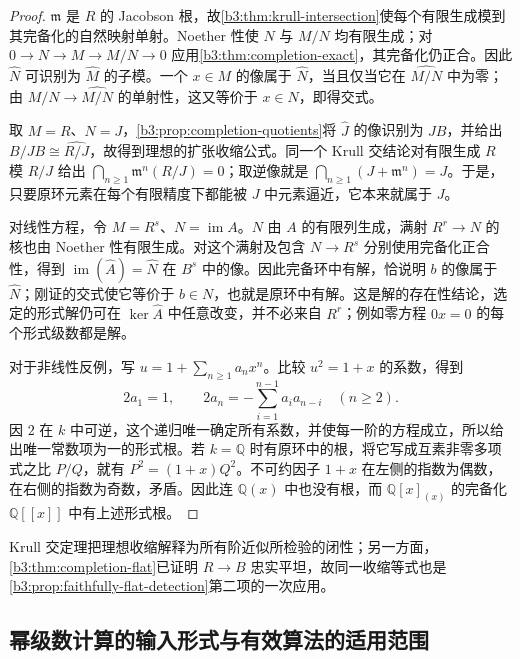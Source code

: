 \begin{proof}
	\(\mathfrak m\) 是 \(R\) 的 Jacobson 根，故\cref{b3:thm:krull-intersection}使每个有限生成模到其完备化的自然映射单射。Noether 性使 \(N\) 与 \(M/N\) 均有限生成；对 \(0\rightarrow N\rightarrow M\rightarrow M/N\rightarrow0\) 应用\cref{b3:thm:completion-exact}，其完备化仍正合。因此 \(\widehat N\) 可识别为 \(\widehat M\) 的子模。一个 \(x\in M\) 的像属于 \(\widehat N\)，当且仅当它在 \(\widehat{M/N}\) 中为零；由 \(M/N\to\widehat{M/N}\) 的单射性，这又等价于 \(x\in N\)，即得交式。

	取 \(M=R\)、\(N=J\)，\cref{b3:prop:completion-quotients}将 \(\widehat J\) 的像识别为 \(JB\)，并给出 \(B/JB\cong\widehat{R/J}\)，故得到理想的扩张收缩公式。同一个 Krull 交结论对有限生成 \(R\) 模 \(R/J\) 给出 \(\bigcap_{n\ge1}\mathfrak m^n(R/J)=0\)；取逆像就是 \(\bigcap_{n\ge1}(J+\mathfrak m^n)=J\)。于是，只要原环元素在每个有限精度下都能被 \(J\) 中元素逼近，它本来就属于 \(J\)。

	对线性方程，令 \(M=R^s\)、\(N=\operatorname{im}A\)。\(N\) 由 \(A\) 的有限列生成，满射 \(R^r\to N\) 的核也由 Noether 性有限生成。对这个满射及包含 \(N\to R^s\) 分别使用完备化正合性，得到 \(\operatorname{im}(\widehat A)=\widehat N\) 在 \(B^s\) 中的像。因此完备环中有解，恰说明 \(b\) 的像属于 \(\widehat N\)；刚证的交式使它等价于 \(b\in N\)，也就是原环中有解。这是解的存在性结论，选定的形式解仍可在 \(\ker\widehat A\) 中任意改变，并不必来自 \(R^r\)；例如零方程 \(0x=0\) 的每个形式级数都是解。

	对于非线性反例，写 \(u=1+\sum_{n\ge1}a_nx^n\)。比较 \(u^2=1+x\) 的系数，得到
	\[
		2a_1=1,\qquad 2a_n=-\sum_{i=1}^{n-1}a_ia_{n-i}\quad(n\ge2).
	\]
	因 \(2\) 在 \(k\) 中可逆，这个递归唯一确定所有系数，并使每一阶的方程成立，所以给出唯一常数项为一的形式根。若 \(k=\mathbb Q\) 时有原环中的根，将它写成互素非零多项式之比 \(P/Q\)，就有 \(P^2=(1+x)Q^2\)。不可约因子 \(1+x\) 在左侧的指数为偶数，在右侧的指数为奇数，矛盾。因此连 \(\mathbb Q(x)\) 中也没有根，而 \(\mathbb Q[x]_{(x)}\) 的完备化 \(\mathbb Q[\![x]\!]\) 中有上述形式根。
\end{proof}

Krull 交定理把理想收缩解释为所有阶近似所检验的闭性；另一方面，\cref{b3:thm:completion-flat}已证明 \(R\to B\) 忠实平坦，故同一收缩等式也是\cref{b3:prop:faithfully-flat-detection}第二项的一次应用。

\subsection{幂级数计算的输入形式与有效算法的适用范围}
\label{b3:subsec:1305:04}

